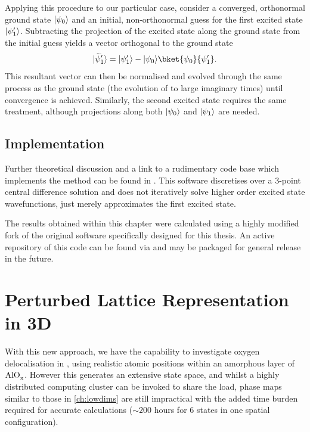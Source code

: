 Applying this procedure to our particular case, consider a converged, orthonormal ground state $\lvert\psi_0\rangle$ and an initial, non-orthonormal guess for the first excited state $\lvert\psi^\prime_1\rangle$.
Subtracting the projection of the excited state along the ground state from the initial guess yields a vector orthogonal to the ground state
\begin{equation}
\lvert\widetilde{\psi}^\prime_1\rangle = \ket{\psi^\prime_1}-\ket{\psi_0}\bket{\psi_0}{\psi^\prime_1}.
\end{equation}
This resultant vector can then be normalised and evolved through the same process as the ground state (\ie the evolution of  to large imaginary times) until convergence is achieved.
Similarly, the second excited state requires the same treatment, although projections along both $\lvert\psi_0\rangle$ and $\lvert\psi_1\rangle$ are needed.

\subsection{Implementation}

Further theoretical discussion and a link to a rudimentary code base which implements the method can be found in .
This software discretises over a 3-point central difference solution and does not iteratively solve higher order excited state wavefunctions, just merely approximates the first excited state.

The results obtained within this chapter were calculated using a highly modified fork of the original software specifically designed for this thesis.
An active repository of this code can be found via  and may be packaged for general release in the future.

\section[Perturbed Lattice Representation in \lin{3D}]{Perturbed Lattice Representation in 3D}\label{sec:aloal3d}

With this new approach, we have the capability to investigate oxygen delocalisation in , using realistic atomic positions within an amorphous layer of $\ce{AlO_x}$.
However this generates an extensive state space, and whilst a highly distributed computing cluster can be invoked to share the load, phase maps similar to those in \cref{ch:lowdims} are still impractical with the added time burden required for accurate calculations ($\sim 200$ hours for 6 states in one spatial configuration).

